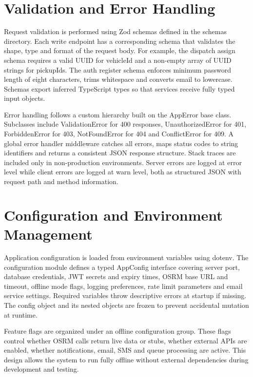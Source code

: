 \documentclass[12pt,a4paper]{report}
\newcommand{\chapterheader}{CHAPTER HEADING}
\begin{document}
\section{Validation and Error Handling}
Request validation is performed using Zod schemas defined in the schemas directory. Each write endpoint has a corresponding schema that validates the shape, type and format of the request body. For example, the dispatch assign schema requires a valid UUID for vehicleId and a non-empty array of UUID strings for pickupIds. The auth register schema enforces minimum password length of eight characters, trims whitespace and converts email to lowercase. Schemas export inferred TypeScript types so that services receive fully typed input objects.

Error handling follows a custom hierarchy built on the AppError base class. Subclasses include ValidationError for 400 responses, UnauthorizedError for 401, ForbiddenError for 403, NotFoundError for 404 and ConflictError for 409. A global error handler middleware catches all errors, maps status codes to string identifiers and returns a consistent JSON response structure. Stack traces are included only in non-production environments. Server errors are logged at error level while client errors are logged at warn level, both as structured JSON with request path and method information.

\section{Configuration and Environment Management}
Application configuration is loaded from environment variables using dotenv. The configuration module defines a typed AppConfig interface covering server port, database credentials, JWT secrets and expiry times, OSRM base URL and timeout, offline mode flags, logging preferences, rate limit parameters and email service settings. Required variables throw descriptive errors at startup if missing. The config object and its nested objects are frozen to prevent accidental mutation at runtime.

Feature flags are organized under an offline configuration group. These flags control whether OSRM calls return live data or stubs, whether external APIs are enabled, whether notifications, email, SMS and queue processing are active. This design allows the system to run fully offline without external dependencies during development and testing.
\clearpage

\renewcommand{\chapterheader}{CHAPTER 3}
\end{document}
